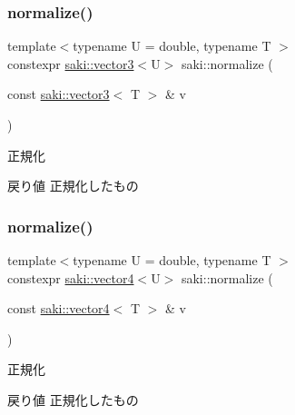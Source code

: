 \subsubsection{\texorpdfstring{normalize()}{normalize()}\hspace{0.1cm}{\footnotesize\ttfamily [2/3]}}
{\footnotesize\ttfamily template$<$typename U  = double, typename T $>$ \\
constexpr \mbox{\hyperlink{classsaki_1_1vector3}{saki\+::vector3}}$<$U$>$ saki\+::normalize (\begin{DoxyParamCaption}\item[{const \mbox{\hyperlink{classsaki_1_1vector3}{saki\+::vector3}}$<$ T $>$ \&}]{v }\end{DoxyParamCaption})}



正規化 

\begin{DoxyReturn}{戻り値}
正規化したもの 
\end{DoxyReturn}
\mbox{\label{namespacesaki_afcef74d7e32ef8cf446d075beeed4b41}} 
\subsubsection{\texorpdfstring{normalize()}{normalize()}\hspace{0.1cm}{\footnotesize\ttfamily [3/3]}}
{\footnotesize\ttfamily template$<$typename U  = double, typename T $>$ \\
constexpr \mbox{\hyperlink{classsaki_1_1vector4}{saki\+::vector4}}$<$U$>$ saki\+::normalize (\begin{DoxyParamCaption}\item[{const \mbox{\hyperlink{classsaki_1_1vector4}{saki\+::vector4}}$<$ T $>$ \&}]{v }\end{DoxyParamCaption})}



正規化 

\begin{DoxyReturn}{戻り値}
正規化したもの 
\end{DoxyReturn}
\mbox{\label{namespacesaki_aed742cc915a830fea9f4993c0a031c45}} 
